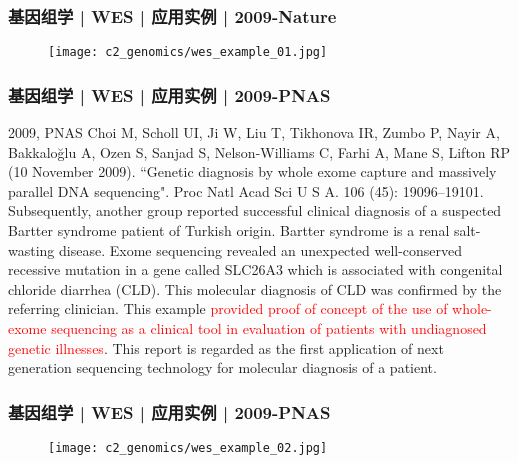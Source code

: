 \begin{frame}
  \frametitle{基因组学 | WES | 应用实例 | 2009-Nature}
  \begin{figure}
    \centering
    \texttt{[image: c2\_genomics/wes\_example\_01.jpg]}
  \end{figure}
\end{frame}

\begin{frame}
  \frametitle{基因组学 | WES | 应用实例 | 2009-PNAS}
  \footnotesize{
  \begin{block}{2009, PNAS}
  Choi M, Scholl UI, Ji W, Liu T, Tikhonova IR, Zumbo P, Nayir A, Bakkaloğlu A, Ozen S, Sanjad S, Nelson-Williams C, Farhi A, Mane S, Lifton RP (10 November 2009). ``Genetic diagnosis by whole exome capture and massively parallel DNA sequencing". Proc Natl Acad Sci U S A. 106 (45): 19096–19101.\\
  \vspace{1em}
  Subsequently, another group reported successful clinical diagnosis of a suspected Bartter syndrome patient of Turkish origin. Bartter syndrome is a renal salt-wasting disease. Exome sequencing revealed an unexpected well-conserved recessive mutation in a gene called SLC26A3 which is associated with congenital chloride diarrhea (CLD). This molecular diagnosis of CLD was confirmed by the referring clinician. This example \textcolor{red}{provided proof of concept of the use of whole-exome sequencing as a clinical tool in evaluation of patients with undiagnosed genetic illnesses}. This report is regarded as the first application of next generation sequencing technology for molecular diagnosis of a patient.
  \end{block}
}
\end{frame}

\begin{frame}
  \frametitle{基因组学 | WES | 应用实例 | 2009-PNAS}
  \begin{figure}
    \centering
    \texttt{[image: c2\_genomics/wes\_example\_02.jpg]}
  \end{figure}
\end{frame}

